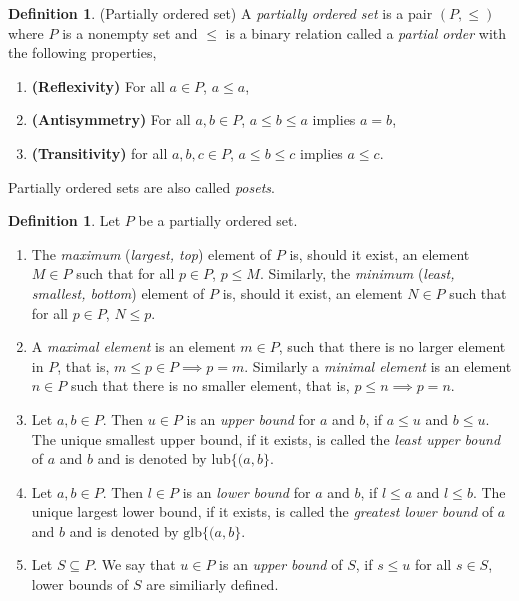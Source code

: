 \documentclass[12pt]{article}
\theoremstyle{definition}
\newtheorem{definition}[theorem]{Definition}
\begin{document}
\begin{definition}(Partially ordered set)
    A \textit{partially ordered set} is a pair $(P,\leq)$ where $P$ is a nonempty set and $\leq$ is a binary relation called a \textit{partial order} with the following properties,
    \begin{enumerate}
        \item \textbf{(Reflexivity)} For all $a\in P$, $a \leq a$,
        \item \textbf{(Antisymmetry)} For all $a,b\in P$, $a\leq b\leq a$ implies $a=b$,
        \item \textbf{(Transitivity)} for all $a,b,c\in P$, $a\leq b\leq c$ implies $a\leq c$.
    \end{enumerate}
    Partially ordered sets are also called \textit{posets}.
\end{definition}
\begin{definition}
    Let $P$ be a partially ordered set.
    \begin{enumerate}
        \item The \textit{maximum} (\textit{largest, top}) element of $P$ is, should it exist, an element $M\in P$  such that for all $p\in P$, $p\leq M$. Similarly, the \textit{minimum} (\textit{least, smallest, bottom}) element of $P$ is, should it exist, an element $N\in P$ such that for all $p\in P$, $N\leq p$.
        \item A \textit{maximal element} is an element $m\in P$, such that there is no larger element in $P$, that is, $m\leq p\in P\implies p=m$. Similarly a \textit{minimal element} is an element $n\in P$ such that there is no smaller element, that is, $p\leq n\implies p=n$. 
        \item Let $a,b\in P$. Then $u\in P$ is an \textit{upper bound} for $a$ and $b$, if $a\leq u$ and $b\leq u$. The unique smallest upper bound, if it exists, is called the \textit{least upper bound} of $a$ and $b$ and is denoted by $\text{lub}\{(a,b\}$.
        \item Let $a,b\in P$. Then $l\in P$ is an \textit{lower bound} for $a$ and $b$, if $l\leq a$ and $l\leq b$. The unique largest lower bound, if it exists, is called the \textit{greatest lower bound} of $a$ and $b$ and is denoted by $\text{glb}\{(a,b\}$.
        \item Let $S\subseteq P$. We say that $u\in P$ is an \textit{upper bound} of $S$, if $s\leq u$ for all $s\in S$, lower bounds of $S$ are similiarly defined.
    \end{enumerate}
\end{definition}
\end{document}

